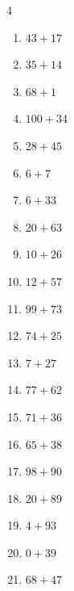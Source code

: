 \begin{multicols}{4}
\begin{enumerate}
  \item $43+17$
        \phantom{$=60$}

  \item $35+14$
        \phantom{$=49$}

  \item $68+1$
        \phantom{$=69$}

  \item $100+34$
        \phantom{$=134$}

\columnbreak %

  \item $28+45$
        \phantom{$=73$}

  \item $6+7$
        \phantom{$=13$}

  \item $6+33$
        \phantom{$=39$}

  \item $20+63$
        \phantom{$=83$}

  \item $10+26$
        \phantom{$=36$}

  \item $12+57$
        \phantom{$=69$}

  \item $99+73$
        \phantom{$=172$}

  \item $74+25$
        \phantom{$=99$}

  \item $7+27$
        \phantom{$=34$}

  \item $77+62$
        \phantom{$=139$}

  \item $71+36$
        \phantom{$=107$}

  \item $65+38$
        \phantom{$=103$}

  \item $98+90$
        \phantom{$=188$}

  \item $20+89$
        \phantom{$=109$}

  \item $4+93$
        \phantom{$=97$}

  \item $0+39$
        \phantom{$=39$}

  \item $68+47$
        \phantom{$=115$}


\end{enumerate}
\end{multicols}

